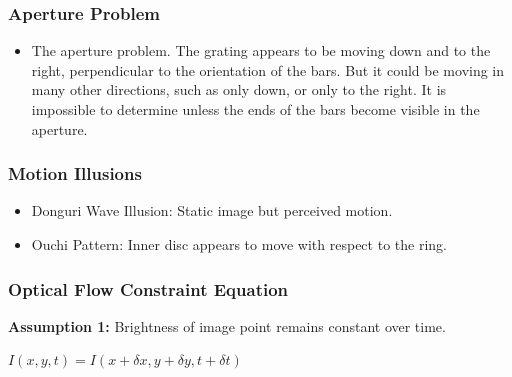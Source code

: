 \begin{frame}
  \frametitle{Aperture Problem}
  \begin{figure}[!h]
    \hspace*{2em}
  \end{figure}
  \begin{itemize}
    \item The aperture problem. The grating appears to be moving down and to the right, perpendicular to the orientation of the bars. But it could be moving in many other directions, such as only down, or only to the right. It is impossible to determine unless the ends of the bars become visible in the aperture.
  \end{itemize}
\end{frame}

\begin{frame}
  \frametitle{Motion Illusions}
\begin{itemize}
  \item Donguri Wave Illusion: Static image but perceived motion.
  \item Ouchi Pattern: Inner disc appears to move with respect to the ring.
\end{itemize}

\vspace{0.5cm}
\centering
\end{frame}

\begin{frame}
  \frametitle{Optical Flow Constraint Equation}
\textbf{Assumption 1:} Brightness of image point remains constant over time.

$ I(x,y,t) = I(x+\delta x, y+\delta y, t+\delta t) $

\vspace{0.5cm}
\centering
\end{frame}

